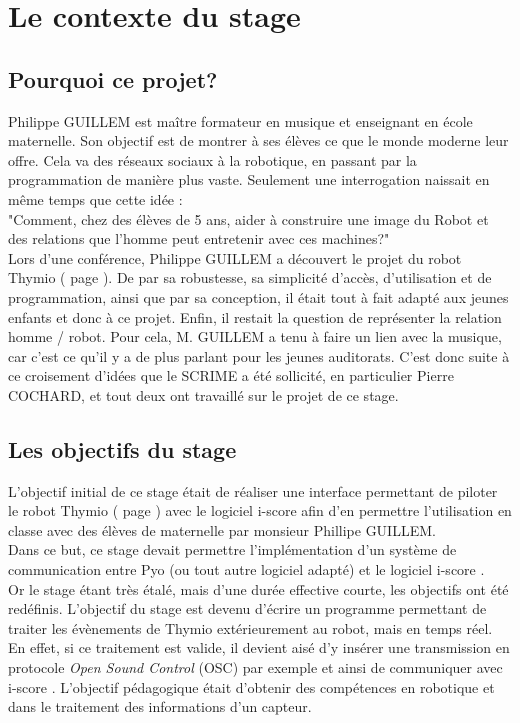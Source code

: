 \documentclass[a4paper, 12pt]{report}
\begin{document}
\section{Le contexte du stage}
\subsection{Pourquoi ce projet?}

Philippe GUILLEM est maître formateur en musique et enseignant en école maternelle. Son objectif est de montrer à ses élèves ce que le monde moderne leur offre. Cela va des réseaux sociaux à la robotique, en passant par la programmation de manière plus vaste. Seulement une interrogation naissait en même temps que cette idée :\\

"Comment, chez des élèves de 5 ans, aider à construire une image du Robot et des relations que l'homme peut entretenir avec ces machines?" \cite{FragClasseThymio}\\

Lors d'une conférence, Philippe GUILLEM a découvert le projet du robot Thymio ( page \pageref{thymio} ). De par sa robustesse, sa simplicité d'accès, d'utilisation et de programmation, ainsi que par sa conception, il était tout à fait adapté aux jeunes enfants et donc à ce projet.
Enfin, il restait la question de représenter la relation homme / robot. Pour cela, M. GUILLEM a tenu à faire un lien avec la musique, car c'est ce qu'il y a de plus parlant pour les jeunes auditorats. C'est donc suite à ce croisement d'idées que le SCRIME a été sollicité, en particulier Pierre COCHARD, et tout deux ont travaillé sur le projet de ce stage.


\subsection{Les objectifs du stage}
L'objectif initial de ce stage était de réaliser une interface permettant de piloter le robot Thymio ( page \pageref{thymio} ) avec le logiciel i-score \cite{ISCORE} afin d'en permettre l'utilisation en classe avec des élèves de maternelle par monsieur Phillipe GUILLEM. \\
Dans ce but, ce stage devait permettre l'implémentation d'un système de communication entre Pyo \cite{PYO2016} (ou tout autre logiciel adapté) et le logiciel i-score \cite{ISCORE}.\\
Or le stage étant très étalé, mais d'une durée effective courte, les objectifs ont été redéfinis. L'objectif du stage est devenu d'écrire un programme permettant de traiter les évènements de Thymio extérieurement au robot, mais en temps réel. En effet, si ce traitement est valide, il devient aisé d'y insérer une transmission en protocole \textit{Open Sound Control} (OSC) \cite{OSC2016} par exemple et ainsi de communiquer avec i-score  \cite{ISCORE}.
L'objectif pédagogique était d'obtenir des compétences en robotique et dans le traitement des informations d'un capteur. 
\end{document}
